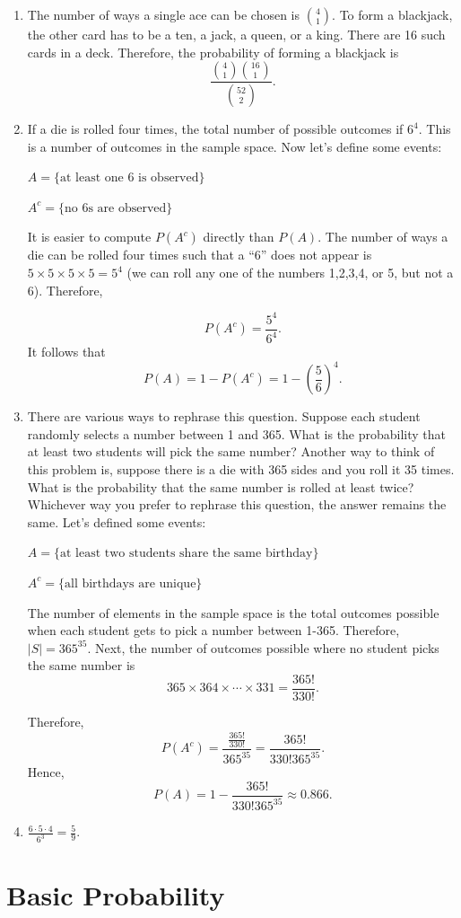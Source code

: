 \documentclass[
  12pt,
]{krantzNoCorner}
\begin{document}
\begin{enumerate}
\def\labelenumi{\arabic{enumi}.}
\item
  The number of ways a single ace can be chosen is \(\binom{4}{1}.\) To
  form a blackjack, the other card has to be a ten, a jack, a queen,
  or a king. There are 16 such cards in a deck. Therefore, the
  probability of forming a blackjack is
  \[\frac{\binom{4}{1}\binom{16}{1}}{\binom{52}{2}}.\]
\item
  If a die is rolled four times, the total number of possible outcomes
  if \(6^4.\) This is a number of outcomes in the sample space.
  Now let's define some events:

  \(A=\{\mbox{at least one 6 is observed}\}\)

  \(A^c=\{\mbox{no 6s are observed}\}\)

  It is easier to compute \(P(A^c)\) directly than \(P(A).\) The number of
  ways a die can be rolled four times such that a ``6'' does not appear
  is \(5\times 5\times 5\times 5 = 5^4\) (we can roll any one of the
  numbers 1,2,3,4, or 5, but not a 6). Therefore,

  \[P(A^c)=\frac{5^4}{6^4}.\]It follows that
  \[P(A)=1-P(A^c)=1-\left(\frac{5}{6}\right)^4.\]
\item
  There are various ways to rephrase this question. Suppose each
  student randomly selects a number between 1 and 365. What is the
  probability that at least two students will pick the same number?
  Another way to think of this problem is, suppose there is a die with
  365 sides and you roll it 35 times. What is the probability that the
  same number is rolled at least twice? Whichever way you prefer to
  rephrase this question, the answer remains the same. Let's defined
  some events:

  \(A=\{\mbox{at least two students share the same birthday}\}\)

  \(A^c=\{\mbox{all birthdays are unique}\}\)

  The number of elements in the sample space is the total outcomes
  possible when each student gets to pick a number between 1-365.
  Therefore, \(|S|=365^{35}.\) Next, the number of outcomes possible
  where no student picks the same number is
  \[365\times 364\times\cdots\times 331 = \frac{365!}{330!}.\]

  Therefore,
  \[P(A^c)=\frac{\frac{365!}{330!}}{365^{35}}=\frac{365!}{330!365^{35}}.\]
  Hence, \[P(A)=1-\frac{365!}{330!365^{35}}\approx 0.866.\]
\item
  \(\frac{6\cdot 5\cdot 4}{6^3}= \frac{5}{9}.\)
\end{enumerate}

\hypertarget{basic-probability}{%
\chapter{Basic Probability}\label{basic-probability}}
\end{document}
